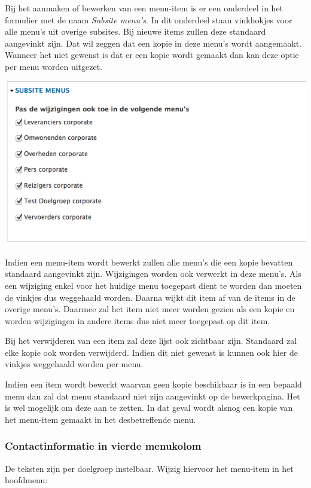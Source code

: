 Bij het aanmaken of bewerken van een menu-item is er een onderdeel in het formulier met de naam \emph{Subsite menu's}. In dit onderdeel staan vinkhokjes voor alle menu's uit overige subsites. Bij nieuwe items zullen deze standaard aangevinkt zijn. Dat wil zeggen dat een kopie in deze menu's wordt aangemaakt. Wanneer het niet gewenst is dat er een kopie wordt gemaakt dan kan deze optie per menu worden uitgezet.

\begin{center}
\includegraphics[scale=.7]{img/menukopie.png}
\end{center}

Indien een menu-item wordt bewerkt zullen alle menu's die een kopie bevatten standaard aangevinkt zijn. Wijzigingen worden ook verwerkt in deze menu's. Als een wijziging enkel voor het huidige menu toegepast dient te worden dan moeten de vinkjes dus weggehaald worden. Daarna wijkt dit item af van de items in de overige menu's. Daarmee zal het item niet meer worden gezien als een kopie en worden wijzigingen in andere items dus niet meer toegepast op dit item.

Bij het verwijderen van een item zal deze lijst ook zichtbaar zijn. Standaard zal elke kopie ook worden verwijderd. Indien dit niet gewenst is kunnen ook hier de vinkjes weggehaald worden per menu.

Indien een item wordt bewerkt waarvan geen kopie beschikbaar is in een bepaald menu dan zal dat menu standaard niet zijn aangevinkt op de bewerkpagina. Het is wel mogelijk om deze aan te zetten. In dat geval wordt alsnog een kopie van het menu-item gemaakt in het desbetreffende menu.

\subsubsection{Contactinformatie in vierde menukolom}\label{menumultishizzle}
De teksten zijn per doelgroep instelbaar. Wijzig hiervoor het menu-item in het hoofdmenu:

